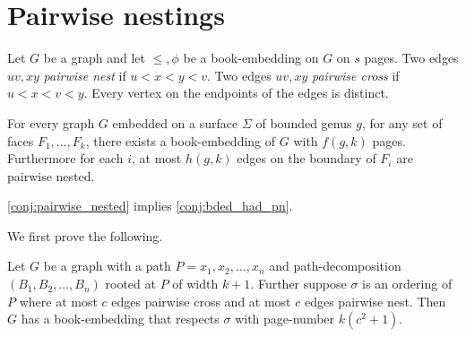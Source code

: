 

\section{Pairwise nestings}
Let $G$ be a graph and let $\leq, \phi$ be a book-embedding on $G$ on $s$ pages. Two edges $uv, xy$ \textit{pairwise nest} if $u < x < y < v$. Two edges $uv, xy$ \textit{pairwise cross} if $u < x < v < y$. Every vertex on the endpoints of the edges is distinct.

\begin{conjecture}\label{conj:pairwise_nested}
    For every graph $G$ embedded on a surface $\Sigma$ of bounded genus $g$, for any set of faces $F_1, \ldots, F_k$, there exists a book-embedding of $G$ with $f(g, k)$ pages. Furthermore for each $i$, at most $h(g, k)$ edges on the boundary of $F_i$ are pairwise nested. 
\end{conjecture}

\cref{conj:pairwise_nested} implies \cref{conj:bded_had_pn}. 

We first prove the following.
\begin{proposition}\label{prop:nested_edges}
    Let $G$ be a graph with a path $P = x_1, x_2, \ldots, x_n$ and  path-decomposition $(B_1, B_2, \ldots, B_n)$ rooted at $P$ of width $k + 1$. Further suppose $\sigma$ is an ordering of $P$ where at most $c$ edges pairwise cross and at most $c$ edges pairwise nest. Then $G$ has a book-embedding that respects $\sigma$ with page-number $k(c^2 + 1)$.
\end{proposition}

